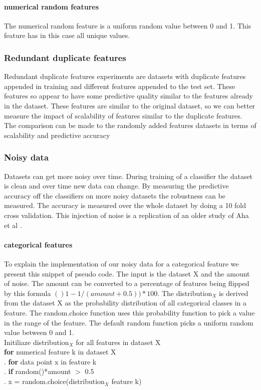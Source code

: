 \documentclass[a4paper,10pt]{article}
\begin{document}
\paragraph{numerical random features \newline}
The numerical random feature is a uniform random value between 0 and 1. This feature has in this case all unique values.

\subsubsection{Redundant duplicate features}
Redundant duplicate features experiments are datasets with duplicate features appended in training and different features appended to the test set. These features so appear to have some predictive quality similar to the features already in the dataset. These features are similar to the original dataset, so we can better measure the impact of scalability of features similar to the duplicate features. The comparison can be made to the randomly added features datasets in terms of scalability and predictive accuracy 


\subsubsection{Noisy data}
Datasets can get more noisy over time. During training of a classifier the dataset is clean and over time new data can change. By measuring the predictive accuracy off the classifiers on more noisy datasets the robustness can be measured. The accuracy is measured over the whole dataset by doing a 10 fold cross validation. This injection of noise is a replication of an older study of Aha et al \cite{Noise}.

\paragraph{categorical features \newline}
To explain the implementation of our noisy data for a categorical feature we present this snippet of pseudo code. The input is the dataset X and the amount of noise. The amount can be converted to a percentage of features being flipped by this formula $()1-1/(amount+0.5))*100$. The distribution$_X$ is derived from the dataset X as the probability distribution of all categorical classes in a feature. The random.choice function uses this probability function to pick a value in the range of the feature. The default random function picks a uniform random value between 0 and 1.  \\
Initiliaze distribution$_X$ for all features in dataset X\\ 
\newline
\textbf{for} numerical feature k in dataset X\\
.\hspace{1cm} \textbf{for} data point x in feature k\\
.\hspace{2cm} \textbf{if} random()*amount $>$ 0.5 \\	
.\hspace{3cm} x = random.choice(distribution$_X$ feature k) 
\\
\end{document}
